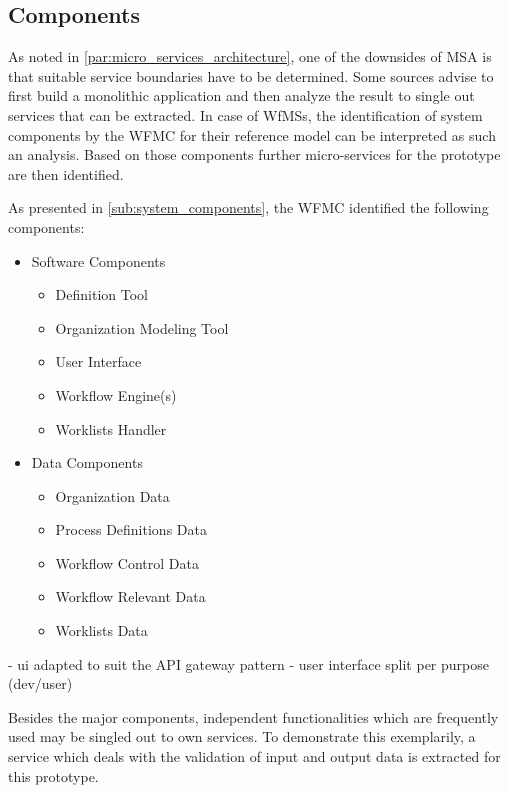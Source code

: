 \subsection{Components} %
\label{sub:components}
  As noted in \ref{par:micro_services_architecture}, one of the downsides of \ac{MSA} is that suitable service boundaries have to be determined. Some sources advise to first build a monolithic application and then analyze the result to single out services that can be extracted. In case of \acp{WfMS}, the identification of system components by the \ac{WFMC} for their reference model can be interpreted as such an analysis. Based on those components further micro-services for the prototype are then identified.

  As presented in \ref{sub:system_components}, the \ac{WFMC} identified the following components:
    \begin{itemize}[nosep]
      \item Software Components
        \begin{itemize}[nosep]
          \item Definition Tool
          \item Organization Modeling Tool
          \item User Interface
          \item Workflow Engine(s)
          \item Worklists Handler
        \end{itemize}
      \item Data Components
        \begin{itemize}[nosep]
          \item Organization Data
          \item Process Definitions Data
          \item Workflow Control Data
          \item Workflow Relevant Data
          \item Worklists Data
        \end{itemize}
    \end{itemize}

    - ui adapted to suit the API gateway pattern
    - user interface split per purpose (dev/user)

  Besides the major components, independent functionalities which are frequently used may be singled out to own services. To demonstrate this exemplarily, a service which deals with the validation of input and output data is extracted for this prototype.

